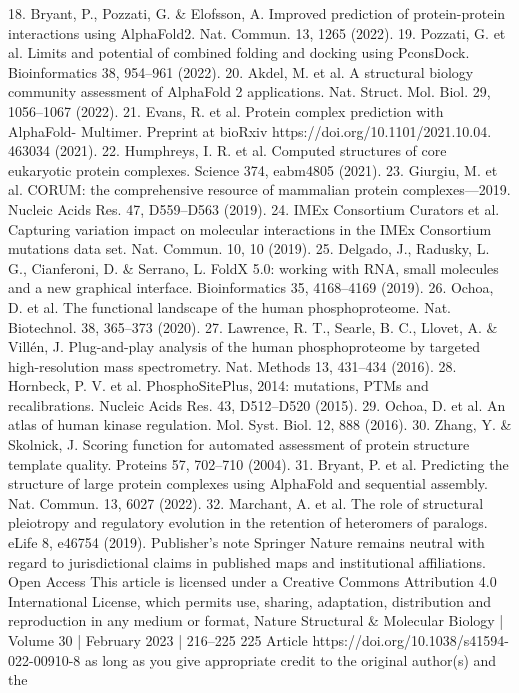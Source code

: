 18.	 Bryant, P., Pozzati, G. \& Elofsson, A. Improved prediction of
protein-protein interactions using AlphaFold2. Nat. Commun. 13,
1265 (2022).
19.	 Pozzati, G. et al. Limits and potential of combined folding and
docking using PconsDock. Bioinformatics 38, 954–961 (2022).
20.	 Akdel, M. et al. A structural biology community assessment
of AlphaFold 2 applications. Nat. Struct. Mol. Biol. 29,
1056–1067 (2022).
21.	 Evans, R. et al. Protein complex prediction with AlphaFold-
Multimer. Preprint at bioRxiv https://doi.org/10.1101/2021.10.04.
463034 (2021).
22.	 Humphreys, I. R. et al. Computed structures of core eukaryotic
protein complexes. Science 374, eabm4805 (2021).
23.	 Giurgiu, M. et al. CORUM: the comprehensive resource of
mammalian protein complexes—2019. Nucleic Acids Res. 47,
D559–D563 (2019).
24.	 IMEx Consortium Curators et al. Capturing variation impact on
molecular interactions in the IMEx Consortium mutations data
set. Nat. Commun. 10, 10 (2019).
25.	 Delgado, J., Radusky, L. G., Cianferoni, D. \& Serrano, L. FoldX
5.0: working with RNA, small molecules and a new graphical
interface. Bioinformatics 35, 4168–4169 (2019).
26.	 Ochoa, D. et al. The functional landscape of the human
phosphoproteome. Nat. Biotechnol. 38, 365–373 (2020).
27.	 Lawrence, R. T., Searle, B. C., Llovet, A. \& Villén, J. Plug-and-play
analysis of the human phosphoproteome by targeted
high-resolution mass spectrometry. Nat. Methods 13,
431–434 (2016).
28.	 Hornbeck, P. V. et al. PhosphoSitePlus, 2014: mutations, PTMs and
recalibrations. Nucleic Acids Res. 43, D512–D520 (2015).
29.	 Ochoa, D. et al. An atlas of human kinase regulation. Mol. Syst.
Biol. 12, 888 (2016).
30.	 Zhang, Y. \& Skolnick, J. Scoring function for automated
assessment of protein structure template quality. Proteins 57,
702–710 (2004).
31.	 Bryant, P. et al. Predicting the structure of large protein
complexes using AlphaFold and sequential assembly. Nat.
Commun. 13, 6027 (2022).
32.	 Marchant, A. et al. The role of structural pleiotropy and regulatory
evolution in the retention of heteromers of paralogs. eLife 8,
e46754 (2019).
Publisher’s note Springer Nature remains neutral with regard to
jurisdictional claims in published maps and institutional affiliations.
Open Access This article is licensed under a Creative Commons
Attribution 4.0 International License, which permits use, sharing,
adaptation, distribution and reproduction in any medium or format,
Nature Structural \& Molecular Biology | Volume 30 | February 2023 | 216–225
225
Article
https://doi.org/10.1038/s41594-022-00910-8
as long as you give appropriate credit to the original author(s) and the
